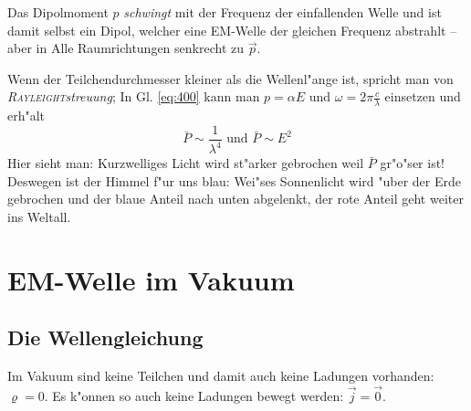 \begin{Beispiel}
\begin{itemize}
      Das Dipolmoment $p$ \emph{schwingt} mit der Frequenz der
      einfallenden Welle und ist damit selbst ein Dipol, welcher eine
      EM-Welle der gleichen Frequenz abstrahlt -- aber in Alle
      Raumrichtungen senkrecht zu $\vec p$.


      Wenn der Teilchendurchmesser kleiner als die Wellenl"ange ist,
      spricht man von \emph{\textsc{Rayleight}streuung}; In
      Gl. \eqref{eq:400} kann man $p = \alpha E$ und $\omega =
      2\pi\frac{c}{\lambda}$ einsetzen und erh"alt
      \begin{equation*}
         \bar P \sim \frac{1}{\lambda^4} \text{ und } \bar P \sim E^2
      \end{equation*}
      Hier sieht man: Kurzwelliges Licht wird st"arker gebrochen weil
      $\bar P$ gr"o"ser ist! Deswegen ist der Himmel f"ur uns blau:
      Wei"ses Sonnenlicht wird "uber der Erde gebrochen und der blaue
      Anteil nach unten abgelenkt, der rote Anteil geht weiter ins Weltall.

   \end{itemize}
\end{Beispiel}







\section{EM-Welle im Vakuum}
\label{kap_em-welle-im-vakuum}

\subsection{Die Wellengleichung}
\label{kap_wellengleichung}


Im Vakuum sind keine Teilchen und damit auch keine Ladungen vorhanden:
$\varrho = 0$. Es k"onnen so auch keine Ladungen bewegt werden: $\vec j
= \vec 0$.

